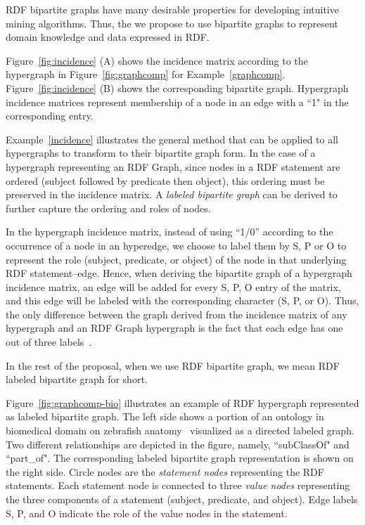 RDF bipartite graphs have many desirable properties for developing intuitive mining algorithms. Thus, the we propose to use bipartite graphs to represent domain knowledge and data expressed in RDF.

\begin{myexp}
\label{incidence}
Figure~\ref{fig:incidence} (A) shows the incidence matrix according to the hypergraph in Figure~\ref{fig:graphcomp} for Example~\ref{graphcomp}. Figure~\ref{fig:incidence} (B) shows the corresponding bipartite graph. Hypergraph incidence matrices represent membership of a node in an edge with a ``1" in the corresponding entry.
\end{myexp}

Example~\ref{incidence} illustrates the general method that can be applied to all hypergraphs to transform to their bipartite graph form. In the case of a hypergraph representing an RDF Graph, since nodes in a RDF statement are ordered (subject followed by predicate then object), this ordering must be preserved in the incidence matrix. A \emph{labeled bipartite graph} can be derived to further capture the ordering and roles of nodes.

\begin{mydef}
In the hypergraph incidence matrix, instead of using ``1/0'' according to the occurrence of a node in an hyperedge, we choose to label them by S, P or O to represent the role (subject, predicate, or object) of the node in that underlying RDF statement--edge. Hence, when deriving the bipartite graph of a hypergraph incidence matrix, an edge will be added for every S, P, O entry of the matrix, and this edge will be labeled with the corresponding character (S, P, or O). Thus, the only difference between the graph derived from the incidence matrix of any hypergraph and an RDF Graph hypergraph is the fact that each edge has one out of three labels~\cite{GraphModelRDF}.
\end{mydef}

In the rest of the proposal, when we use RDF bipartite graph, we mean RDF labeled bipartite graph for short.

\begin{myexp}
Figure~\ref{fig:graphcomp-bio} illustrates an example of RDF hypergraph represented as labeled bipartite graph. The left side shows a portion of an ontology in biomedical domain on zebrafish anatomy~\cite{ZFA} visualized as a directed labeled graph. Two different relationships are depicted in the figure, namely, ``subClassOf" and ``part\_of". The corresponding labeled bipartite graph representation is shown on the right side. Circle nodes are the \emph{statement nodes} representing the RDF statements. Each statement node is connected to three \emph{value nodes} representing the three components of a statement (subject, predicate, and object). Edge labels S, P, and O indicate the role of the value nodes in the statement.
\end{myexp}

